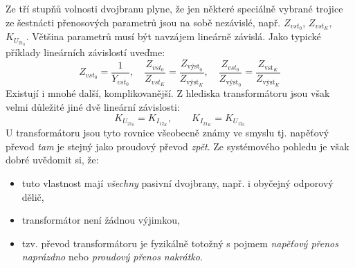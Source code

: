       Ze tří stupňů volnosti dvojbranu plyne, že jen některé speciálně vybrané trojice ze
      šestnácti přenosových parametrů jsou na sobě nezávislé, např. \(Z_{vst_0}\),  \(Z_{vst_K}\), 
      \(K_{U_{21_0}}\). Většina parametrů musí být navzájem lineárně závislá. Jako typické příklady 
      lineárních závislostí uveďme:
      \begin{equation*}          %
        Z_{vst_0} = \frac{1}{Y_{vst_0}}, \quad 
        \frac{Z_{vst_0}}{Z_{vst_K}}=\frac{Z_{\text{výst}_0}}{Z_{\text{výst}_K}}, \quad
        \frac{Z_{vst_0}}{Z_{\text{výst}_0}}=\frac{Z_{\text{vst}_K}}{Z_{\text{výst}_K}}
      \end{equation*}
      Existují i mnohé další, komplikovanější. Z hlediska transformátoru jsou však velmi důležité 
      jiné dvě lineární závislosti:
      \begin{equation}\label{ES:eq_topol15}
        K_{U_{21_0}} = K_{I_{12_K}}, \qquad 
        K_{I_{21_K}} = K_{U_{12_0}}
      \end{equation}
      U transformátoru jsou tyto rovnice všeobecně známy ve smyslu tj. napěťový převod \emph{tam} 
      je stejný jako proudový převod \emph{zpět}. Ze systémového pohledu je však dobré uvědomit si, 
      že:
      \begin{itemize}\addtolength{\itemsep}{-0.5\baselineskip}
        \item tuto vlastnost mají \emph{všechny} pasivní dvojbrany, např. i obyčejný odporový dělič,
        \item transformátor není žádnou výjimkou,
        \item tzv. převod transformátoru je fyzikálně totožný s pojmem \emph{napěťový přenos 
              naprázdno} nebo \emph{proudový přenos nakrátko}.
      \end{itemize}
      
